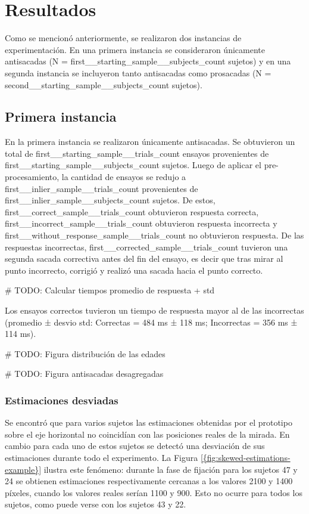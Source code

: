 \section{{Resultados}}

Como se mencionó anteriormente, se realizaron dos instancias de experimentación.
En una primera instancia se consideraron únicamente antisacadas (N =
{first__starting_sample__subjects_count} sujetos) y en una segunda
instancia se incluyeron tanto antisacadas como prosacadas (N =
{second__starting_sample__subjects_count} sujetos).

\subsection{{Primera instancia}}

En la primera instancia se realizaron únicamente antisacadas. Se obtuvieron un
total de {first__starting_sample__trials_count} ensayos provenientes de
{first__starting_sample__subjects_count} sujetos.
Luego de aplicar el pre-procesamiento, la cantidad de ensayos se redujo a
{first__inlier_sample__trials_count} provenientes de
{first__inlier_sample__subjects_count} sujetos.
De estos, {first__correct_sample__trials_count} obtuvieron respuesta correcta,
{first__incorrect_sample__trials_count} obtuvieron respuesta incorrecta y
{first__without_response_sample__trials_count} no obtuvieron respuesta.
De las respuestas incorrectas, {first__corrected_sample__trials_count} tuvieron
una segunda sacada correctiva antes del fin del ensayo, es decir que tras mirar
al punto incorrecto, corrigió y realizó una sacada hacia el punto correcto.

# TODO: Calcular tiempos promedio de respuesta + std

Los ensayos correctos tuvieron un tiempo de respuesta mayor al de las
incorrectas (promedio ± desvio std: Correctas = 484 ms ± 118 ms; Incorrectas =
356 ms ± 114 ms).

# TODO: Figura distribución de las edades

# TODO: Figura antisacadas desagregadas


\subsubsection{{Estimaciones desviadas}}

Se encontró que para varios sujetos las estimaciones obtenidas por el prototipo
sobre el eje horizontal no coincidían con las posiciones reales de la mirada.
En cambio para cada uno de estos sujetos se detectó una desviación de sus
estimaciones durante todo el experimento.
La Figura \ref{{fig:skewed-estimations-example}} ilustra este fenómeno:
durante la fase de fijación para los sujetos 47 y 24 se obtienen estimaciones
respectivamente cercanas a los valores 2100 y 1400 píxeles, cuando los valores
reales serían 1100 y 900.
Esto no ocurre para todos los sujetos, como puede verse con los sujetos 43 y 22.

